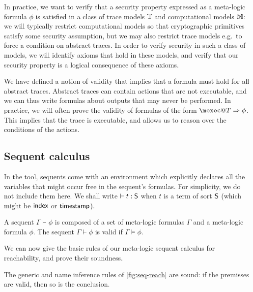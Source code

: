 In practice, we want to verify that a security property expressed as a
meta-logic formula $\phi$ is satisfied in a class of trace models
$\mathbb{T}$ and computational models $\mathbb{M}$: we will typically restrict computational
models so that cryptographic primitives satisfy some security assumption,
but we may also restrict trace models e.g.\ to force a condition on
abstract traces. In order to verify security in such a class of models,
we will identify axioms that hold in these models, and verify that our
security property is a logical consequence of these axioms.

\begin{remark}
  We have defined a notion of validity that implies that a formula must hold for all abstract traces. Abstract traces can contain actions that are not executable, and we can thus write formulas about outputs that may never be performed. In practice, we will often prove the validity of formulas of the form $\mexec@T \Rightarrow \phi$. This implies that the trace is executable, and allows us to reason over the conditions of the actions.
\end{remark}

\subsection{Sequent calculus}

In the tool, sequents come with an environment which explicitly
declares all the variables that might occur free in the sequent's formulas.
For simplicity, we do not include them here. We shall write $\vdash t:\textsf{S}$
when $t$ is a term of sort $\textsf{S}$ (which might be $\textsf{index}$ or $\textsf{timestamp}$).

\begin{definition}
  A sequent $\Gamma \vdash \phi$ is composed of a set of meta-logic formulas
  $\Gamma$ and a meta-logic formula $\phi$.
  The sequent $\Gamma \vdash \phi$ is valid if $\Gamma \models \phi$.
\end{definition}

We can now give the basic rules of our meta-logic sequent calculus for reachability, and prove their soundness.
\begin{proposition}
  The generic and name inference rules of \cref{fig:seq-reach} are sound: if the premisses are valid,
  then so is the conclusion.
\end{proposition}


